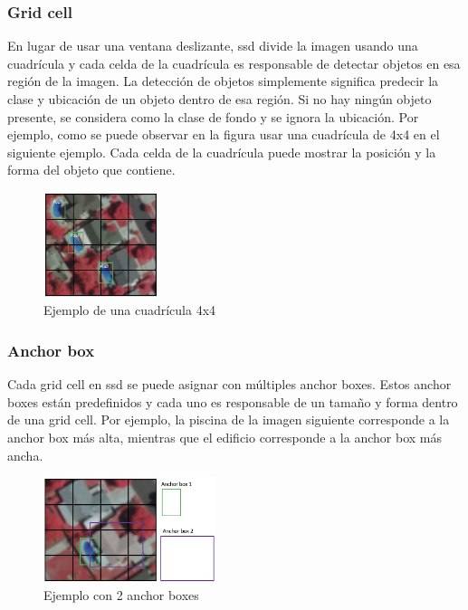 \subsubsection*{Grid cell}
\label{subsubsec:grid-cell-ssd}

En lugar de usar una ventana deslizante, \gls{ssd} divide la imagen usando una cuadrícula y cada celda de la cuadrícula es responsable de detectar objetos en esa región de la imagen. La detección de objetos simplemente significa predecir la clase y ubicación de un objeto dentro de esa región. Si no hay ningún objeto presente, se considera como la clase de fondo y se ignora la ubicación. Por ejemplo, como se puede observar en la figura usar una cuadrícula de 4x4 en el siguiente ejemplo. Cada celda de la cuadrícula puede mostrar la posición y la forma del objeto que contiene.

\begin{figure}[ht]
\centering
\includegraphics[width=0.3\textwidth]{img/chapters/estado-del-arte/gridcell.png}
\caption{\label{fig:ejemplo-grid-cell}Ejemplo de una cuadrícula 4x4 \cite{how-works-ssd}}
\end{figure}

\subsubsection*{Anchor box}
\label{subsubsec:anchor-box-ssd}

Cada grid cell en \gls{ssd} se puede asignar con múltiples anchor boxes. Estos anchor boxes están predefinidos y cada uno es responsable de un tamaño y forma dentro de una grid cell. Por ejemplo, la piscina de la imagen siguiente corresponde a la anchor box más alta, mientras que el edificio corresponde a la anchor box más ancha.

\begin{figure}[ht]
\centering
\includegraphics[width=0.45\textwidth]{img/chapters/estado-del-arte/ejemplo-2-anchor-boxes.png}
\caption{\label{fig:ejemplo-2-anchor-boxes}Ejemplo con 2 anchor boxes \cite{how-works-ssd}}
\end{figure}

